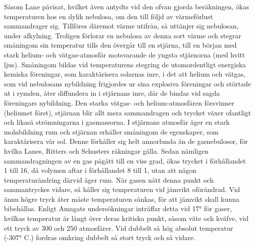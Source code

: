 \documentclass[a4paper, 12pt, oneside, swedish]{article}
\begin{document}
Såsom Lane påvisat, hvilket även antydts vid den ofvan gjorda beräkningen, ökas temperaturen hos en dylik nebulosa, om den till följd av värmeförlust sammandrager sig. Tillföres däremot värme utifrån, så uttänjer sig nebulosan, under afkylning. Troligen förlorar en nebulosa av denna sort värme och stegrar småningom sin temperatur tills den övergår till en stjärna, till en början med stark helium- och vätgas-atmosfär motsvarande de yngsta stjärnorna (med hvitt ljus). Småningom bildas vid temperaturens stegring de utomordentligt energiska kemiska föreningar, som karaktärisera solarnas inre, i det att helium och vätgas, som vid nebulosans nybildning frigjordes ur sina explosiva föreningar och störtade ut i rymden, åter diffundera in i stjärnans inre, där de bindas vid sagda föreningars nybildning. Den starka vätgas- och helium-atmosfären försvinner (heliumet först), stjärnan blir allt mera sammandragen och trycket växer ofantligt och likaså strömningarna i gasmassorna. I stjärnans atmosfär äger en stark molnbildning rum och stjärnan erhåller småningom de egenskaper, som karaktärisera vår sol. Denne förhåller sig helt annorlunda än de gasnebulosor, för hvilka Lanes, Ritters och Schusters räkningar gälla. Sedan nämligen sammandragningen av en gas pågått till en viss grad, ökas trycket i förhållandet 1 till 16, då volymen aftar i förhållandet 8 till 1, utan att någon temperaturändring därvid äger rum. När gasen nått denna punkt och sammantryckes vidare, så håller sig temperaturen vid jämvikt oförändrad. Vid ännu högre tryck åter måste temperaturen sänkas, för att jämvikt skall kunna bibehållas. Enligt Amagats undersökningar inträffar detta vid 17° för gaser, hvilkas temperatur är långt över deras kritiska punkt, såsom väte och kväfve, vid ett tryck av 300 och 250 atmosfärer. Vid dubbelt så hög absolut temperatur (-307° C.) fordras omkring dubbelt så stort tryck och så vidare.
\end{document}
